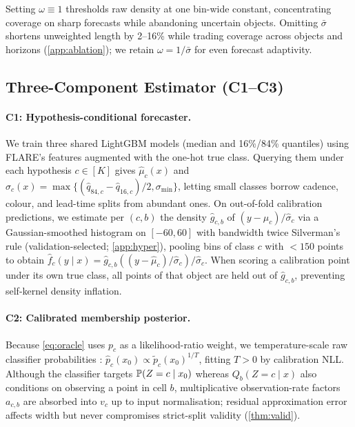 \begin{remark}
\label{rem:abs}
Setting $\omega\equiv1$ thresholds raw density at one bin-wide constant, concentrating coverage on sharp forecasts while abandoning uncertain objects.
Omitting $\bar\sigma$ shortens unweighted length by 2--16\% while trading coverage across objects and horizons (\cref{app:ablation}); we retain $\omega=1/\bar\sigma$ for even forecast adaptivity.
\end{remark}

\subsection{Three-Component Estimator (C1--C3)}
\label{sec:c3}
\paragraph{C1: Hypothesis-conditional forecaster.}
We train three shared LightGBM models (median and 16\%/84\% quantiles) using FLARE's features augmented with the one-hot true class.
Querying them under each hypothesis $c\in[K]$ gives $\hat\mu_c(x)$ and $\hat\sigma_c(x)=\max\{(\hat q_{84,c}-\hat q_{16,c})/2,\sigma_{\min}\}$, letting small classes borrow cadence, colour, and lead-time splits from abundant ones.
On out-of-fold calibration predictions, we estimate per $(c,b)$ the density $\hat g_{c,b}$ of $(y-\hat\mu_c)/\hat\sigma_c$ via a Gaussian-smoothed histogram on $[-60,60]$ with bandwidth twice Silverman's rule (validation-selected; \cref{app:hyper}), pooling bins of class $c$ with $<150$ points to obtain $\hat f_c(y\mid x)=\hat g_{c,b}((y-\hat\mu_c)/\hat\sigma_c)/\hat\sigma_c$.
When scoring a calibration point under its own true class, all points of that object are held out of $\hat g_{c,b}$, preventing self-kernel density inflation.

\paragraph{C2: Calibrated membership posterior.}
Because \cref{eq:oracle} uses $p_c$ as a likelihood-ratio weight, we temperature-scale raw classifier probabilities \citep{guo2017calibration}: $\hat p_c(x_0)\propto \tilde p_c(x_0)^{1/T}$, fitting $T>0$ by calibration NLL.
Although the classifier targets $\P(Z=c\mid x_0)$ whereas $Q_b(Z=c\mid x)$ also conditions on observing a point in cell $b$, multiplicative observation-rate factors $a_{c,b}$ are absorbed into $v_c$ up to input normalisation; residual approximation error affects width but never compromises strict-split validity (\cref{thm:valid}).

